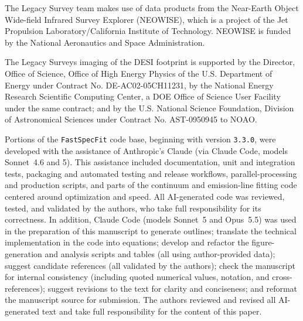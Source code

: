 \documentclass[modern,linenumbers]{aastex702}
\newcommand{\fastspecfit}{\texttt{FastSpecFit}}
\begin{document}
\begin{acknowledgements}
The Legacy Survey team makes use of data products from the Near-Earth
Object Wide-field Infrared Survey Explorer (NEOWISE), which is a
project of the Jet Propulsion Laboratory/California Institute of
Technology. NEOWISE is funded by the National Aeronautics and Space
Administration.

The Legacy Surveys imaging of the DESI footprint is supported by the
Director, Office of Science, Office of High Energy Physics of the
U.S. Department of Energy under Contract No. DE-AC02-05CH11231, by the
National Energy Research Scientific Computing Center, a DOE Office of
Science User Facility under the same contract; and by the
U.S. National Science Foundation, Division of Astronomical Sciences
under Contract No. AST-0950945 to NOAO.

Portions of the \fastspecfit{} code base, beginning with version
\texttt{3.3.0}, were developed with the assistance of Anthropic's
Claude (via Claude Code, models Sonnet~4.6 and 5). This assistance
included documentation, unit and integration tests, packaging and
automated testing and release workflows, parallel-processing and
production scripts, and parts of the continuum and emission-line
fitting code centered around optimization and speed. All AI-generated
code was reviewed, tested, and validated by the authors, who take full
responsibility for its correctness. In addition, Claude Code (models
Sonnet~5 and Opus~5.5) was used in the preparation of this manuscript
to generate outlines; translate the technical implementation in the
code into equations; develop and refactor the figure-generation and
analysis scripts and tables (all using author-provided data); suggest
candidate references (all validated by the authors); check the
manuscript for internal consistency (including quoted numerical
values, notation, and cross-references); suggest revisions to the text
for clarity and conciseness; and reformat the manuscript source for
submission. The authors reviewed and revised all AI-generated text and
take full responsibility for the content of this paper.

\end{acknowledgements}

\end{document}
